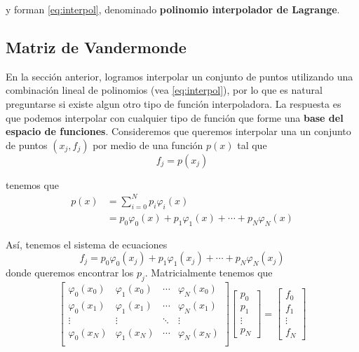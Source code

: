 y forman \eqref{eq:interpol}, denominado \textbf{polinomio interpolador de Lagrange}.


\subsection{Matriz de Vandermonde}

En la sección anterior, logramos interpolar un conjunto de puntos utilizando una combinación lineal de polinomios (vea \eqref{eq:interpol}), por lo que es natural preguntarse si existe algun otro tipo de función interpoladora. La respuesta es que podemos interpolar con cualquier tipo de función que forme una \textbf{base del espacio de funciones}. Consideremos que queremos interpolar una un conjunto de puntos $(x_{j}, f_{j})$ por medio de una función $p(x)$ tal que
\begin{equation*}
  f_{j} = p(x_{j})
\end{equation*}

tenemos que
\begin{align}
  p(x) &= \sum_{i = 0}^{N}p_{i}\varphi_{i}(x) \\
       &= p_{0} \varphi_{0}(x) + p_{1} \varphi_{1}(x) + \cdots + p_{N} \varphi_{N}(x)
\end{align}

Así, tenemos el sistema de ecuaciones
\begin{equation}
  f_{j} = p_{0} \varphi_{0}(x_{j}) + p_{1} \varphi_{1}(x_{j}) + \cdots + p_{N} \varphi_{N}(x_{j})
 \end{equation}
donde queremos encontrar los $p_{j}$. Matricialmente tenemos que
\begin{equation} \label{eq:vandercasi}
\begin{bmatrix}
  \varphi_{0}(x_{0}) & \varphi_{1}(x_{0}) & \cdots & \varphi_{N}(x_{0}) \\
  \varphi_{0}(x_{1}) & \varphi_{1}(x_{1}) & \cdots & \varphi_{N}(x_{1}) \\ 
  \vdots & \vdots & \ddots & \vdots \\
  \varphi_{0}(x_{N}) & \varphi_{1}(x_{N}) & \cdots & \varphi_{N}(x_{N}) \\
\end{bmatrix}
\begin{bmatrix}
  p_{0} \\ p_{1} \\ \vdots \\ p_{N}
\end{bmatrix}
  =
\begin{bmatrix}
  f_{0} \\ f_{1} \\ \vdots \\ f_{N}
\end{bmatrix}
\end{equation}

